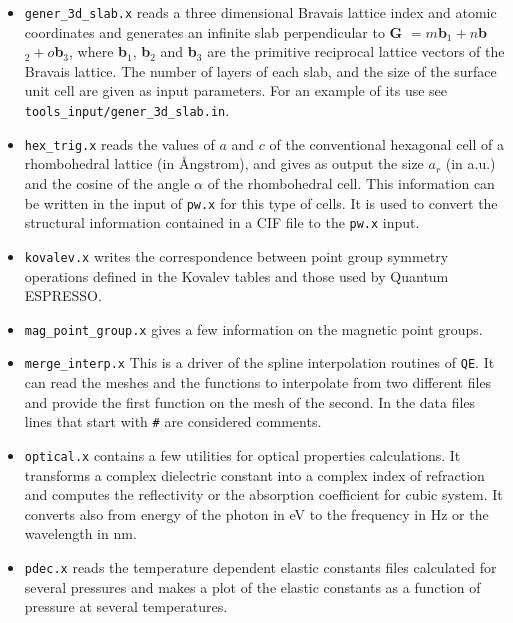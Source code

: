 \documentclass[12pt,a4paper,twoside]{report}
\def\qe{{\sc Quantum ESPRESSO}}
\begin{document}
\begin{itemize}
\item \texttt{gener\_3d\_slab.x} reads a three dimensional
Bravais lattice index and atomic coordinates and generates an infinite slab
perpendicular to {\bf G} $= m ${\bf b}$_1 + n ${\bf b}$_2 + o ${\bf b}$_3$, 
where {\bf b}$_1$, {\bf b}$_2$ and {\bf b}$_3$ are the primitive reciprocal 
lattice
vectors of the Bravais lattice. The number of layers of each slab, and the
size of the surface unit cell are given as input parameters.
For an example of its use see \texttt{tools\_input/gener\_3d\_slab.in}.

\item \texttt{hex\_trig.x} reads the values of $a$ and $c$
of the conventional hexagonal cell of a rhombohedral lattice (in \AA ngstrom),
and gives as output the size $a_r$ (in a.u.) and the cosine of the angle
$\alpha$ of the rhombohedral cell. This information can
be written in the input of \texttt{pw.x} for this type of cells. It
is used to convert the structural information contained in a CIF file
to the \texttt{pw.x} input.

\item \texttt{kovalev.x} writes the correspondence between point group
symmetry operations defined in the Kovalev tables and those used by \qe.

\item \texttt{mag\_point\_group.x} gives a few information on the magnetic point
groups.

\item \texttt{merge\_interp.x} This is a driver of the spline
interpolation routines of \texttt{QE}. It can read the meshes and the
functions to interpolate from two different files and provide the
first function on the mesh of the second. In the data files
lines that start with \texttt{\#} are considered comments.

\item \texttt{optical.x} contains a few utilities for
optical properties calculations. It transforms a complex dielectric 
constant into a complex index of refraction and computes the reflectivity 
or the absorption coefficient for cubic system. It converts also from 
energy of the photon in eV to the frequency in Hz or the wavelength in nm.

\item \texttt{pdec.x} reads the temperature dependent elastic constants files 
calculated for several pressures and makes a plot of the elastic constants as
a function of pressure at several temperatures.


\end{itemize}
\end{document}
